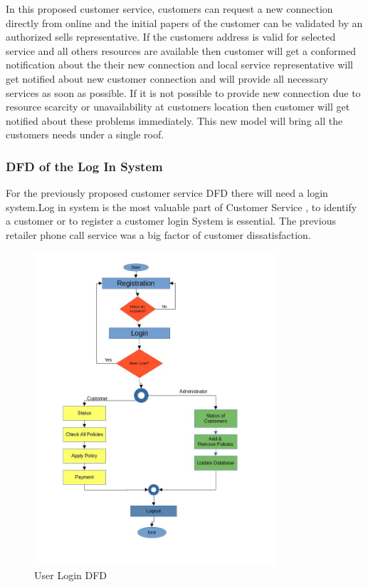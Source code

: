 \begin{spacing}{1}
In this proposed customer service, customers can request a new connection directly from online and the initial papers of the customer can be validated by an authorized sells representative. If the customers address is valid for selected service and all others resources are available then customer will get a conformed notification about the their new connection and local service representative will get notified about new customer connection and will provide all necessary services as soon as possible.  If it is not possible to provide new connection due to resource scarcity or unavailability at customers location then customer will get notified about these problems immediately. This new model will bring all the customers needs under a single roof. 

\subsubsection{DFD of the  Log In System}
For the previously proposed customer service DFD there will need a login system.Log in system is the most valuable part of Customer Service , to identify a customer or to register a customer login System is essential. The previous retailer phone call service was a big factor of customer dissatisfaction.

\begin{figure}[H]
	\centering
	\includegraphics[width=0.8\textwidth]{activity}
	\caption{User Login DFD}
	\label{fig:dfdproposed2}
\end{figure}


\end{spacing}

